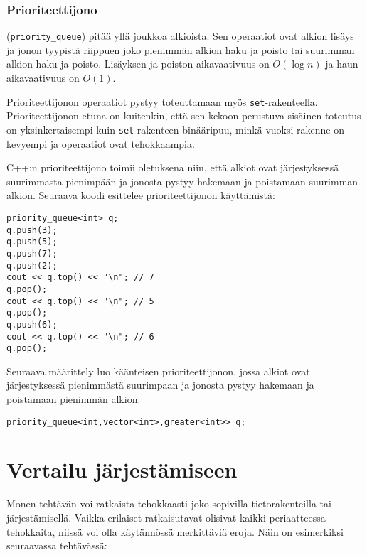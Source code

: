 \subsubsection{Prioriteettijono}


 (\texttt{priority\_queue})
pitää yllä joukkoa alkioista.
Sen operaatiot ovat alkion lisäys ja
jonon tyypistä riippuen joko
pienimmän alkion haku ja poisto tai
suurimman alkion haku ja poisto.
Lisäyksen ja poiston aikavaativuus on $O(\log n)$
ja haun aikavaativuus on $O(1)$.

Prioriteettijonon operaatiot
pystyy toteuttamaan myös \texttt{set}-rakenteella.
Prioriteettijonon etuna on kuitenkin,
että sen kekoon perustuva sisäinen
toteutus on yksinkertaisempi
kuin \texttt{set}-rakenteen binääripuu,
minkä vuoksi rakenne on kevyempi ja
operaatiot ovat tehokkaampia.

\begin{samepage}
C++:n prioriteettijono toimii oletuksena niin,
että alkiot ovat järjestyksessä suurimmasta pienimpään
ja jonosta pystyy hakemaan ja poistamaan suurimman alkion.
Seuraava koodi esittelee prioriteettijonon käyttämistä:

\begin{lstlisting}
priority_queue<int> q;
q.push(3);
q.push(5);
q.push(7);
q.push(2);
cout << q.top() << "\n"; // 7
q.pop();
cout << q.top() << "\n"; // 5
q.pop();
q.push(6);
cout << q.top() << "\n"; // 6
q.pop();
\end{lstlisting}
\end{samepage}

Seuraava määrittely luo käänteisen prioriteettijonon,
jossa alkiot ovat järjestyksessä pienimmästä suurimpaan
ja jonosta pystyy hakemaan ja poistamaan pienimmän alkion:

\begin{lstlisting}
priority_queue<int,vector<int>,greater<int>> q;
\end{lstlisting}

\section{Vertailu järjestämiseen}

Monen tehtävän voi ratkaista tehokkaasti joko
sopivilla tietorakenteilla tai järjestämisellä.
Vaikka erilaiset ratkaisutavat olisivat kaikki
periaatteessa tehokkaita, niissä voi olla
käytännössä merkittäviä eroja.
Näin on esimerkiksi seuraavassa tehtävässä:

